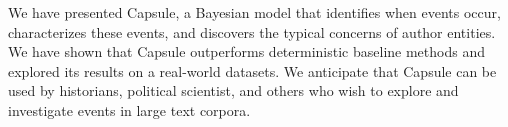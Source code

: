 We have presented Capsule, a Bayesian model that identifies when events occur, characterizes these events, and discovers the typical concerns of author entities.  We have shown that Capsule outperforms deterministic baseline methods and explored its results on a real-world datasets.
We anticipate that Capsule %
can be used by historians, political scientist, and others who wish to explore and investigate events in large text corpora.  
